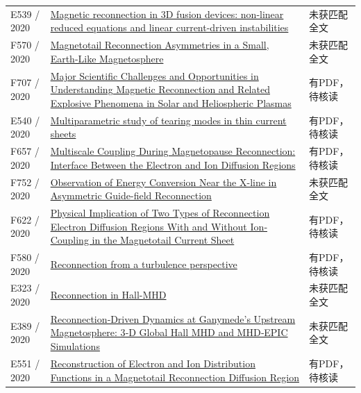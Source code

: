 \begin{longtable}{P{24mm}P{97mm}P{27mm}}
E539 / 2020 & \href{https://doi.org/10.1088/1361-6587/abcab3}{Magnetic reconnection in 3D fusion devices: non-linear reduced equations and linear current-driven instabilities} & 未获匹配全文\\

F570 / 2020 & \href{https://doi.org/10.1002/essoar.10504213.1}{Magnetotail Reconnection Asymmetries in a Small,  Earth-Like Magnetosphere} & 未获匹配全文\\

F707 / 2020 & \href{https://doi.org/10.48550/arxiv.2009.08779}{Major Scientific Challenges and Opportunities in Understanding Magnetic Reconnection and Related Explosive Phenomena in Solar and Heliospheric Plasmas} & 有PDF，待核读\\

E540 / 2020 & \href{https://doi.org/10.1063/5.0022133}{Multiparametric study of tearing modes in thin current sheets} & 有PDF，待核读\\

F657 / 2020 & \href{https://doi.org/10.1029/2020ja027985}{Multiscale Coupling During Magnetopause Reconnection: Interface Between the Electron and Ion Diffusion Regions} & 有PDF，待核读\\

F752 / 2020 & \href{https://doi.org/10.3847/2041-8213/ab8e31}{Observation of Energy Conversion Near the X-line in Asymmetric Guide-field Reconnection} & 未获匹配全文\\

F622 / 2020 & \href{https://doi.org/10.1029/2020gl088761}{Physical Implication of Two Types of Reconnection Electron Diffusion Regions With and Without Ion‐Coupling in the Magnetotail Current Sheet} & 有PDF，待核读\\

F580 / 2020 & \href{https://doi.org/10.1063/1.5128376}{Reconnection from a turbulence perspective} & 有PDF，待核读\\

E323 / 2020 & \href{http://absimage.aps.org/image/DPP20/MWS_DPP20-2020-001941.pdf}{Reconnection in Hall-MHD} & 未获匹配全文\\

E389 / 2020 & \href{https://doi.org/10.1029/2020ja028162}{Reconnection‐Driven Dynamics at Ganymede's Upstream Magnetosphere: 3‐D Global Hall MHD and MHD‐EPIC Simulations} & 未获匹配全文\\

E551 / 2020 & \href{https://doi.org/10.1029/2020ja027879}{Reconstruction of Electron and Ion Distribution Functions in a Magnetotail Reconnection Diffusion Region} & 有PDF，待核读\\


\end{longtable}

